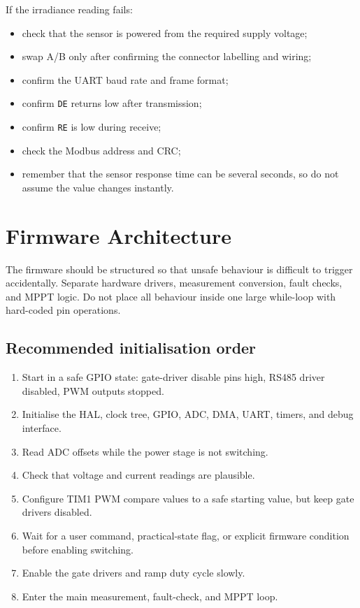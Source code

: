 \documentclass[11pt,a4paper]{article}
\newcommand{\code}[1]{\texttt{#1}}
\let\originalsection\section
\renewcommand{\section}{\clearpage\originalsection}
\begin{document}
If the irradiance reading fails:
\begin{itemize}
  \item check that the sensor is powered from the required supply voltage;
  \item swap A/B only after confirming the connector labelling and wiring;
  \item confirm the UART baud rate and frame format;
  \item confirm \code{DE} returns low after transmission;
  \item confirm \code{RE} is low during receive;
  \item check the Modbus address and CRC;
  \item remember that the sensor response time can be several seconds, so do not assume the value changes instantly.
\end{itemize}

\section{Firmware Architecture}

The firmware should be structured so that unsafe behaviour is difficult to trigger accidentally. Separate hardware drivers, measurement conversion, fault checks, and MPPT logic. Do not place all behaviour inside one large while-loop with hard-coded pin operations.

\subsection{Recommended initialisation order}

\begin{enumerate}
  \item Start in a safe GPIO state: gate-driver disable pins high, RS485 driver disabled, PWM outputs stopped.
  \item Initialise the HAL, clock tree, GPIO, ADC, DMA, UART, timers, and debug interface.
  \item Read ADC offsets while the power stage is not switching.
  \item Check that voltage and current readings are plausible.
  \item Configure TIM1 PWM compare values to a safe starting value, but keep gate drivers disabled.
  \item Wait for a user command, practical-state flag, or explicit firmware condition before enabling switching.
  \item Enable the gate drivers and ramp duty cycle slowly.
  \item Enter the main measurement, fault-check, and MPPT loop.
\end{enumerate}
\end{document}
